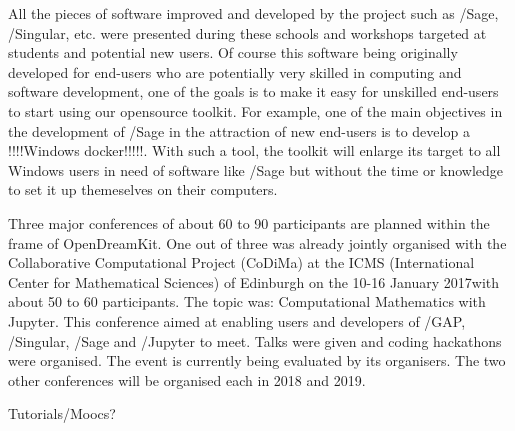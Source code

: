 \documentclass{deliverablereport}
\begin{document}
All the pieces of software improved and developed by the project such as /Sage, /Singular, etc. were presented during these schools and workshops targeted at students and potential new users. Of course this software being originally developed for end-users who are potentially very skilled in computing and software development, one of the goals is to make it easy  for unskilled end-users to start using our opensource toolkit. 
For example, one of the main objectives in the development of /Sage in the attraction of new end-users is to develop a !!!!Windows docker!!!!!. With such a tool, the toolkit will enlarge its target to all Windows users in need of software like /Sage but without the time or knowledge to set it up themeselves on their computers.

Three major conferences of about 60 to 90 participants are planned within the frame of OpenDreamKit. One out of three was already jointly organised with the Collaborative Computational Project (CoDiMa) at the ICMS (International Center for Mathematical Sciences) of Edinburgh on the 10-16 January 2017with about 50 to 60 participants. The topic was: Computational Mathematics with Jupyter. This conference aimed at enabling users and developers of /GAP, /Singular, /Sage and /Jupyter to meet. Talks were given and coding hackathons were organised. The event is currently being evaluated by its organisers. 
The two other conferences will be organised each in 2018 and 2019.

Tutorials/Moocs?
\end{document}
